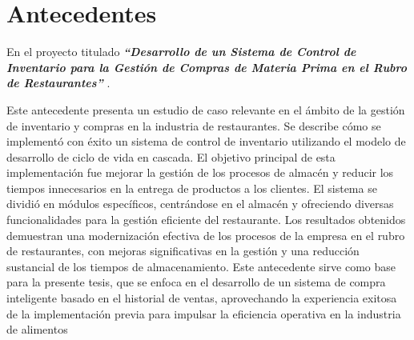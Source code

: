 



\section{Antecedentes}
En el proyecto titulado \textbf{\textit{“Desarrollo de un Sistema de Control de Inventario para la Gestión de Compras de Materia Prima en el Rubro de Restaurantes”}} \cite{condorena2017desarrollo}. 

Este antecedente presenta un estudio de caso relevante en el ámbito de la gestión de inventario y compras en la industria de restaurantes. Se describe cómo se implementó con éxito un sistema de control de inventario utilizando el modelo de desarrollo de ciclo de vida en cascada. El objetivo principal de esta implementación fue mejorar la gestión de los procesos de almacén y reducir los tiempos innecesarios en la entrega de productos a los clientes. El sistema se dividió en módulos específicos, centrándose en el almacén y ofreciendo diversas funcionalidades para la gestión eficiente del restaurante. Los resultados obtenidos demuestran una modernización efectiva de los procesos de la empresa en el rubro de restaurantes, con mejoras significativas en la gestión y una reducción sustancial de los tiempos de almacenamiento. Este antecedente sirve como base para la presente tesis, que se enfoca en el desarrollo de un sistema de compra inteligente basado en el historial de ventas, aprovechando la experiencia exitosa de la implementación previa para impulsar la eficiencia operativa en la industria de alimentos



